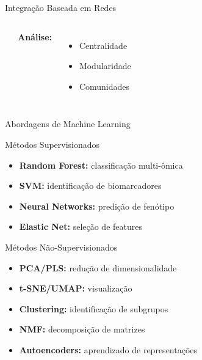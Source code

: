\begin{frame}{Integração Baseada em Redes}
\begin{columns}
\begin{center}
\end{center}

\textbf{Análise:}
\begin{itemize}
    \item Centralidade
    \item Modularidade
    \item Comunidades
\end{itemize}
\end{columns}
\end{frame}

\begin{frame}{Abordagens de Machine Learning}
\begin{block}{Métodos Supervisionados}
\begin{itemize}
    \item \textbf{Random Forest:} classificação multi-ômica
    \item \textbf{SVM:} identificação de biomarcadores
    \item \textbf{Neural Networks:} predição de fenótipo
    \item \textbf{Elastic Net:} seleção de features
\end{itemize}
\end{block}

\begin{block}{Métodos Não-Supervisionados}
\begin{itemize}
    \item \textbf{PCA/PLS:} redução de dimensionalidade
    \item \textbf{t-SNE/UMAP:} visualização
    \item \textbf{Clustering:} identificação de subgrupos
    \item \textbf{NMF:} decomposição de matrizes
    \item \textbf{Autoencoders:} aprendizado de representações
\end{itemize}
\end{block}

\vspace{0.2cm}

\end{frame}

